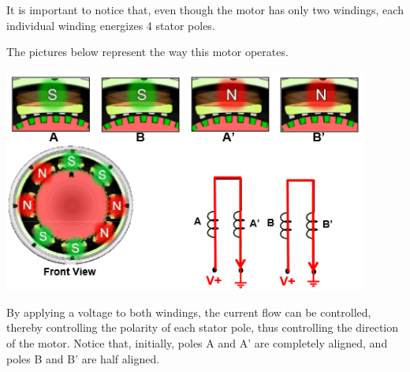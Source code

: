 \begin{figure}[htp]
    \centering
    \hfill
\end{figure}

It is important to notice that, even though the motor has only two windings, each individual winding energizes 4 stator poles.

The pictures below represent the way this motor operates.

\begin{center}
	\includegraphics[width=0.9\textwidth]{figures/move/motor32}
\end{center}

By applying a voltage to both windings, the current flow can be controlled, thereby controlling the polarity of each stator pole, thus controlling the direction of the motor. Notice that, initially, poles A and A’ are completely aligned, and poles B and B’ are half aligned. 

